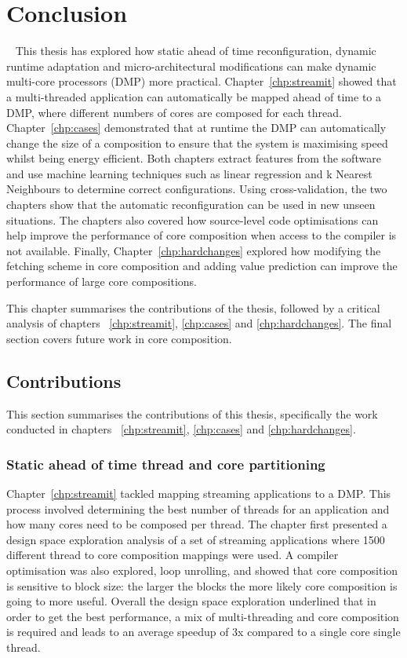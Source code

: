 \chapter{Conclusion}~\label{chp:conclusion}
This thesis has explored how static ahead of time reconfiguration, dynamic runtime adaptation and micro-architectural modifications can make dynamic multi-core processors (DMP) more practical.
Chapter~\ref{chp:streamit} showed that a multi-threaded application can automatically be mapped ahead of time to a DMP, where different numbers of cores are composed for each thread.
Chapter~\ref{chp:cases} demonstrated that at runtime the DMP can automatically change the size of a composition to ensure that the system is maximising speed whilst being energy efficient.
Both chapters extract features from the software and use machine learning techniques such as linear regression and k Nearest Neighbours to determine correct configurations.
Using cross-validation, the two chapters show that the automatic reconfiguration can be used in new unseen situations.
The chapters also covered how source-level code optimisations can help improve the performance of core composition when access to the compiler is not available.
Finally, Chapter~\ref{chp:hardchanges} explored how modifying the fetching scheme in core composition and adding value prediction can improve the performance of large core compositions.

This chapter summarises the contributions of the thesis, followed by a critical analysis of chapters ~\ref{chp:streamit}, \ref{chp:cases} and \ref{chp:hardchanges}.
The final section covers future work in core composition.

\section{Contributions}
This section summarises the contributions of this thesis, specifically the work conducted in chapters  ~\ref{chp:streamit}, \ref{chp:cases} and \ref{chp:hardchanges}.
\subsection{Static ahead of time thread and core partitioning}

Chapter~\ref{chp:streamit} tackled mapping streaming applications to a DMP.
This process involved determining the best number of threads for an application and how many cores need to be composed per thread.
The chapter first presented a design space exploration analysis of a set of streaming applications where 1500 different thread to core composition mappings were used.
A compiler optimisation was also explored, loop unrolling, and showed that core composition is sensitive to block size: the larger the blocks the more likely core composition is going to more useful.
Overall the design space exploration underlined that in order to get the best performance, a mix of multi-threading and core composition is required and leads to an average speedup of 3x compared to a single core single thread.
 

